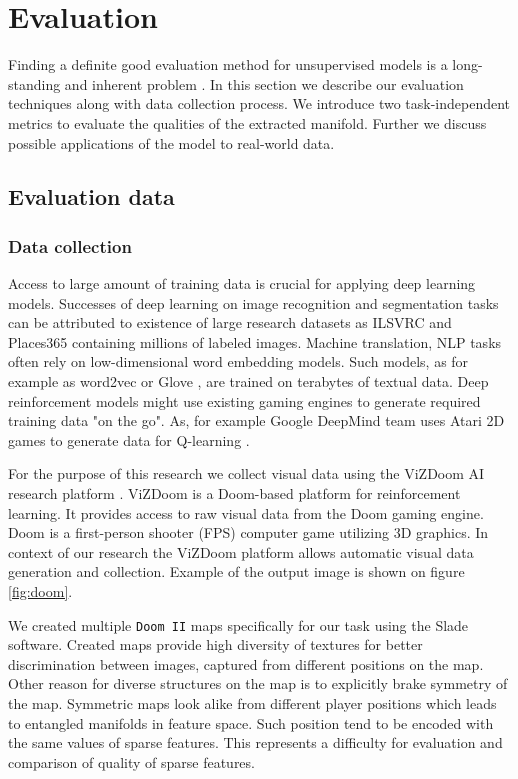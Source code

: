 
\chapter{Evaluation}
\label{ch:eval}

Finding a definite good evaluation method for unsupervised models is a long-standing and inherent problem \cite{Li2015}. In this section we describe our evaluation techniques along with data collection process. We introduce two task-independent metrics to evaluate the qualities of the extracted manifold. Further we discuss possible applications of the model to real-world data.


\section{Evaluation data}
\subsection{Data collection}

Access to large amount of training data is crucial for applying deep learning models.
Successes of deep learning on image recognition and segmentation tasks can be attributed to existence of large research datasets as ILSVRC and Places365 \cite{ILSVRC15, Zhou2016} containing millions of labeled images.
Machine translation, NLP tasks \cite{Karpathy2014, Kim2014} often rely on low-dimensional word embedding models.
Such models, as for example as word2vec or Glove \cite{Mikolov2013, pennington2014glove}, are trained on terabytes of textual data.
Deep reinforcement models might use existing gaming engines to generate required training data "on the go".
As, for example Google DeepMind team uses Atari 2D games to generate data for Q-learning \cite{Mnih2013}.

For the purpose of this research we collect visual data using the ViZDoom AI research platform \cite{Kempka2016}.
ViZDoom is a Doom-based platform for reinforcement learning.
It provides access to raw visual data from the Doom gaming engine.
Doom is a first-person shooter (FPS) computer game utilizing 3D graphics.
In context of our research the ViZDoom platform allows automatic visual data generation and collection.
Example of the output image is shown on figure \ref{fig:doom}.

We created multiple \texttt{Doom II} maps specifically for our task using the Slade \cite{Slade3} software.
Created maps provide high diversity of textures for better discrimination between images, captured from different positions on the map.
Other reason for diverse structures on the map is to explicitly brake symmetry of the map.
Symmetric maps look alike from different player positions which leads to entangled manifolds in feature space.
Such position tend to be encoded with the same values of sparse features.
This represents a difficulty for evaluation and comparison of quality of sparse features.


